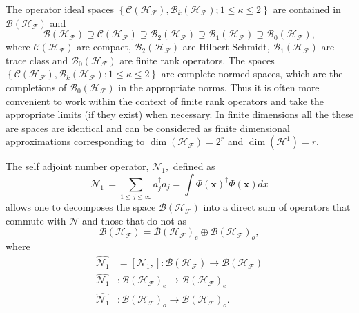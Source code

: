 \documentclass[aps,preprint]{revtex4}%
\begin{document}
The operator ideal spaces $\left\{  \mathcal{C}\left(  \mathcal{H}%
_{\mathcal{F}}\right)  ,\mathcal{B}_{k}\left(  \mathcal{H}_{\mathcal{F}%
}\right)  ;1\leq\kappa\leq2\right\}  $ are contained in $\mathcal{B}\left(
\mathcal{H}_{\mathcal{F}}\right)  $ and
\begin{equation}
\mathcal{B}\left(  \mathcal{H}_{\mathcal{F}}\right)  \supseteq\mathcal{C}%
\left(  \mathcal{H}_{\mathcal{F}}\right)  \supseteq\mathcal{B}_{2}\left(
\mathcal{H}_{\mathcal{F}}\right)  \supseteq\mathcal{B}_{1}\left(
\mathcal{H}_{\mathcal{F}}\right)  \supseteq\mathcal{B}_{0}\left(
\mathcal{H}_{\mathcal{F}}\right)  ,
\end{equation}
where $\mathcal{C}\left(  \mathcal{H}_{\mathcal{F}}\right)  $ are compact,
$\mathcal{B}_{2}\left(  \mathcal{H}_{\mathcal{F}}\right)  $ are Hilbert
Schmidt, $\mathcal{B}_{1}\left(  \mathcal{H}_{\mathcal{F}}\right)  $ are trace
class and $\mathcal{B}_{0}\left(  \mathcal{H}_{\mathcal{F}}\right)  $ are
finite rank operators. The spaces $\left\{  \mathcal{C}\left(  \mathcal{H}%
_{\mathcal{F}}\right)  ,\mathcal{B}_{k}\left(  \mathcal{H}_{\mathcal{F}%
}\right)  ;1\leq\kappa\leq2\right\}  $ are complete normed spaces, which are
the completions of $\mathcal{B}_{0}\left(  \mathcal{H}_{\mathcal{F}}\right)  $
in the appropriate norms. Thus it is often more convenient to work within the
context of finite rank operators and take the appropriate limits (if they
exist) when necessary. In finite dimensions all the these are spaces are
identical and can be considered as finite dimensional approximations
corresponding to $\dim\left(  \mathcal{H}_{\mathcal{F}}\right)  =2^{r}$ and
$\dim\left(  \mathcal{H}^{1}\right)  =r$.

The self adjoint number operator, $\mathcal{N}_{1},$ defined as
\begin{equation}
\mathcal{N}_{1}\mathcal{\,}=\sum_{1\leq j\leq\infty}a_{j}^{\dagger}a_{j}%
=\int\Phi\left(  \boldsymbol{x}\right)  ^{\dagger}\Phi\left(  \boldsymbol{x}%
\right)  dx
\end{equation}
allows one to decomposes the space $\mathcal{B}\left(  \mathcal{H}%
_{\mathcal{F}}\right)  $ into a direct sum of operators that commute with
$\mathcal{N}$ and those that do not as
\begin{equation}
\mathcal{B}\left(  \mathcal{H}_{\mathcal{F}}\right)  =\mathcal{B}\left(
\mathcal{H}_{\mathcal{F}}\right)  _{e}\oplus\mathcal{B}\left(  \mathcal{H}%
_{\mathcal{F}}\right)  _{o},
\end{equation}
where
\begin{align}
\widehat{\mathcal{N}_{1}}  &  =\left[  \mathcal{N}_{1},\right]  :\mathcal{B}%
\left(  \mathcal{H}_{\mathcal{F}}\right)  \rightarrow\mathcal{B}\left(
\mathcal{H}_{\mathcal{F}}\right) \nonumber\\
\widehat{\mathcal{N}_{1}}  &  :\mathcal{B}\left(  \mathcal{H}_{\mathcal{F}%
}\right)  _{e}\rightarrow\mathcal{B}\left(  \mathcal{H}_{\mathcal{F}}\right)
_{e}\nonumber\\
\widehat{\mathcal{N}_{1}}  &  :\mathcal{B}\left(  \mathcal{H}_{\mathcal{F}%
}\right)  _{o}\rightarrow\mathcal{B}\left(  \mathcal{H}_{\mathcal{F}}\right)
_{o}.
\end{align}
\end{document}
